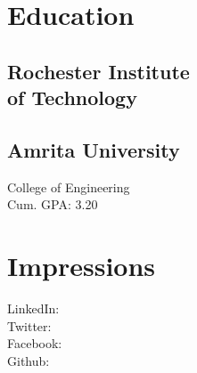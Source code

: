 \documentclass[]{bigfatnoob-resume}
\begin{document}
%
%
\lastupdated

%
%

%
%

\begin{minipage}[t]{0.33\textwidth} 


\section{Education} 

\subsection{Rochester Institute \\ of Technology}
\sectionsep

\subsection{Amrita University}
College of Engineering \\ Cum. GPA: 3.20 
\sectionsep


\section{Impressions} 
LinkedIn: \href{https://www.linkedin.com/in/sandeepmohan777}{} \\
Twitter: \href{https://twitter.com/msandy57}{} \\
Facebook: \href{https://www.facebook.com/sandeepmohan777}{}\\
Github: \href{https:/www.github.com/msandy57}{}
\sectionsep


\end{minipage}
\end{document}
